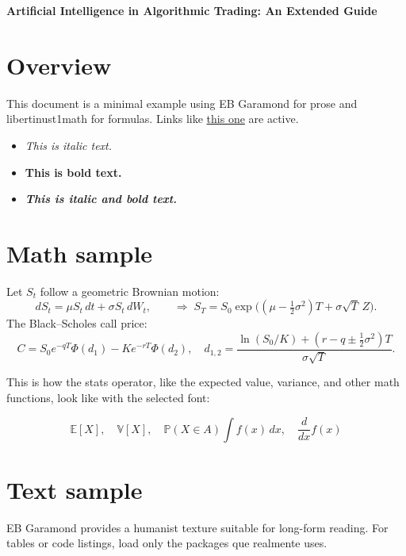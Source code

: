 \documentclass[10pt,a4paper]{article} %
\begin{document}
\thispagestyle{empty}
\vspace*{-5em}
\begin{center}
  \LARGE\textbf{Artificial Intelligence in Algorithmic Trading: An Extended Guide}
\end{center}

\section*{Overview}
This document is a minimal example using EB Garamond for prose and libertinust1math for formulas.
Links like \href{https://example.com}{this one} are active.
\begin{itemize}
  \item \textit{This is italic text.}
  \item \textbf{This is bold text.}
  \item \textbf{\textit{This is italic and bold text.}}
\end{itemize}


\section*{Math sample}
Let $S_t$ follow a geometric Brownian motion:
\[
  dS_t = \mu S_t\,dt + \sigma S_t\,dW_t,\qquad
  \Rightarrow\;
  S_T = S_0 \exp\!\Big((\mu-\tfrac{1}{2}\sigma^2)T+\sigma\sqrt{T}\,Z\Big).
\]
The Black--Scholes call price:
\[
  C = S_0 e^{-qT}\Phi(d_1)-K e^{-rT}\Phi(d_2),
  \quad d_{1,2}=\frac{\ln(S_0/K)+(r-q\pm\tfrac{1}{2}\sigma^2)T}{\sigma\sqrt{T}}.
\]

This is how the stats operator, like the expected value, variance, and other math functions, look like with the selected font:

\[
  \mathbb{E}[X], \quad \mathbb{V}[X], \quad \mathbb{P}(X \in A)
  \int f(x)\,dx, \quad \frac{d}{dx}f(x)
\]

\section*{Text sample}
EB Garamond provides a humanist texture suitable for long-form reading. 
For tables or code listings, load only the packages que realmente uses.
\end{document}
